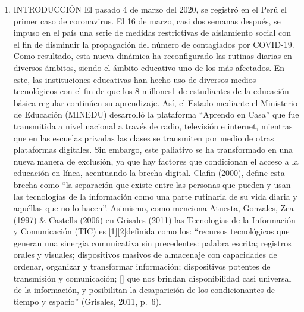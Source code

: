 \begin{enumerate}
\def\labelenumi{\arabic{enumi}.}
\item
  INTRODUCCIÓN El pasado 4 de marzo del 2020, se registró en el Perú el
  primer caso de coronavirus. El 16 de marzo, casi dos semanas después,
  se impuso en el país una serie de medidas restrictivas de aislamiento
  social con el fin de disminuir la propagación del número de
  contagiados por COVID-19. Como resultado, esta nueva dinámica ha
  reconfigurado las rutinas diarias en diversos ámbitos, siendo el
  ámbito educativo uno de los más afectados. En este, las instituciones
  educativas han hecho uso de diversos medios tecnológicos con el fin de
  que los 8 millones1 de estudiantes de la educación básica regular
  continúen su aprendizaje. Así, el Estado mediante el Ministerio de
  Educación (MINEDU) desarrolló la plataforma ``Aprendo en Casa'' que
  fue transmitida a nivel nacional a través de radio, televisión e
  internet, mientras que en las escuelas privadas las clases se
  transmiten por medio de otras plataformas digitales. Sin embargo, este
  paliativo se ha transformado en una nueva manera de exclusión, ya que
  hay factores que condicionan el acceso a la educación en línea,
  acentuando la brecha digital. Clafin (2000), define esta brecha como
  ``la separación que existe entre las personas que pueden y usan las
  tecnologías de la información como una parte rutinaria de su vida
  diaria y aquéllas que no lo hacen''. Asimismo, como menciona Atuesta,
  Gonzales, Zea (1997) \& Castells (2006) en Grisales (2011) las
  Tecnologías de la Información y Comunicación (TIC) es
  {[}1{]}{[}2{]}definida como los: ``recursos tecnológicos que generan
  una sinergia comunicativa sin precedentes: palabra escrita; registros
  orales y visuales; dispositivos masivos de almacenaje con capacidades
  de ordenar, organizar y transformar información; dispositivos potentes
  de transmisión y comunicación; {[}{]} que nos brindan disponibilidad
  casi universal de la información, y posibilitan la desaparición de los
  condicionantes de tiempo y espacio'' (Grisales, 2011, p.~6).


\end{enumerate}
